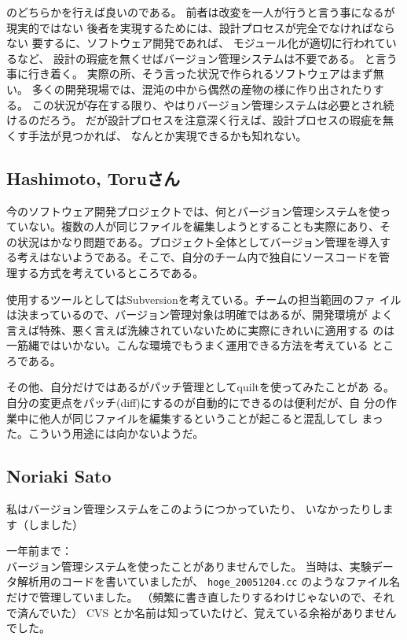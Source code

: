 \documentclass[mingoth,a4paper]{jsarticle}
\begin{document}
のどちらかを行えば良いのである。
前者は改変を一人が行うと言う事になるが現実的ではない
後者を実現するためには、設計プロセスが完全でなければならない
要するに、ソフトウェア開発であれば、
モジュール化が適切に行われているなど、
設計の瑕疵を無くせばバージョン管理システムは不要である。
と言う事に行き着く。
実際の所、そう言った状況で作られるソフトウェアはまず無い。
多くの開発現場では、混沌の中から偶然の産物の様に作り出されたりする。
この状況が存在する限り、やはりバージョン管理システムは必要とされ続けるのだろう。
だが設計プロセスを注意深く行えば、設計プロセスの瑕疵を無くす手法が見つかれば、
なんとか実現できるかも知れない。

\subsection{Hashimoto, Toruさん}

  今のソフトウェア開発プロジェクトでは、何とバージョン管理システムを使っ
ていない。複数の人が同じファイルを編集しようとすることも実際にあり、そ
の状況はかなり問題である。プロジェクト全体としてバージョン管理を導入す
る考えはないようである。そこで、自分のチーム内で独自にソースコードを管
理する方式を考えているところである。

  使用するツールとしてはSubversionを考えている。チームの担当範囲のファ
イルは決まっているので、バージョン管理対象は明確ではあるが、開発環境が
よく言えば特殊、悪く言えば洗練されていないために実際にきれいに適用する
のは一筋縄ではいかない。こんな環境でもうまく運用できる方法を考えている
ところである。

  その他、自分だけではあるがパッチ管理としてquiltを使ってみたことがあ
る。自分の変更点をパッチ(diff)にするのが自動的にできるのは便利だが、自
分の作業中に他人が同じファイルを編集するということが起こると混乱してし
まった。こういう用途には向かないようだ。


\subsection{Noriaki Sato}

私はバージョン管理システムをこのようにつかっていたり、
いなかったりします（しました）

一年前まで：\\
バージョン管理システムを使ったことがありませんでした。
当時は、実験データ解析用のコードを書いていましたが、
\texttt{hoge\_{}20051204.cc} のようなファイル名だけで管理していました。
（頻繁に書き直したりするわけじゃないので、それで済んでいた）
CVS とか名前は知っていたけど、覚えている余裕がありませんでした。
\end{document}
